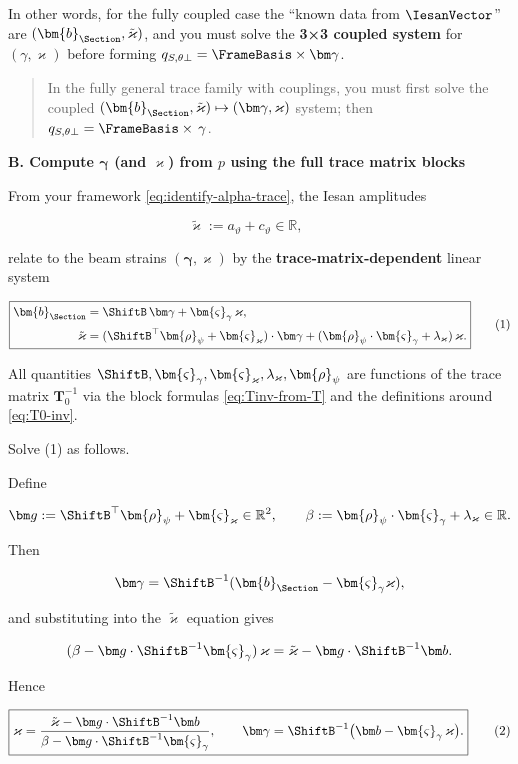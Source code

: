 \begin{Aside}
In other words, for the fully coupled case the ``known data from \(\IesanVector\)''
are \((\bm{b}_{\Section},\tilde\varkappa)\), and you must solve the
\textbf{3×3 coupled system} for \((\gamma,\varkappa)\) before forming
\(q_{S,\theta\perp}=\FrameBasis\times\bm\gamma\).

\begin{quote}
In the fully general trace family with couplings, you must first solve
the coupled
\((\bm{b}_{\Section},\tilde\varkappa)\mapsto(\bm\gamma,\varkappa)\) system;
then \(q_{S,\theta\perp}=\FrameBasis\times\,\gamma\).
\end{quote}


\textbf{B. Compute \(\bm\gamma\) (and \(\varkappa\))
from \(p\) using the \textbf{full} trace matrix
blocks}

From your framework \eqref{eq:identify-alpha-trace}, the Iesan amplitudes

\[
\tilde\varkappa:= a_\vartheta+c_\vartheta \in\mathbb R,
\qquad
\]

relate to the beam strains \((\bm\gamma,\varkappa)\) by the
\textbf{trace‑matrix‑dependent} linear system

\[
\boxed{
\begin{aligned}
\bm{b}_{\Section} &= \ShiftB\,\bm\gamma + \bm{\varsigma}_{\gamma}\,\varkappa,\\[2pt]
\tilde\varkappa&= (\ShiftB^{\top}\bm{\rho}_{\psi}+ \bm{\varsigma}_{\varkappa})\cdot\bm\gamma
+(\bm{\rho}_{\psi}\cdot\bm{\varsigma}_{\gamma}+\lambda_{\varkappa})\,\varkappa.
\end{aligned}
}
\tag{1}
\]

All quantities
\(\ShiftB,\bm{\varsigma}_{\gamma},\bm{\varsigma}_{\varkappa},\lambda_{\varkappa},\bm{\rho}_{\psi}\)
are functions of the trace matrix \(\mathbf{T}_0^{-1}\) via the block
formulas \eqref{eq:Tinv-from-T} and the definitions around \eqref{eq:T0-inv}.

Solve (1) as follows.

Define

\[
\bm g := \ShiftB^{\top}\bm{\rho}_{\psi}+ \bm{\varsigma}_{\varkappa}\in\mathbb R^2,
\qquad
\beta := \bm{\rho}_{\psi}\cdot\bm{\varsigma}_{\gamma}+\lambda_{\varkappa}\in\mathbb R.
\]

Then

\[
\bm\gamma = \ShiftB^{-1}(\bm{b}_{\Section}-\bm{\varsigma}_{\gamma}\varkappa),
\]

and substituting into the \(\tilde\varkappa\) equation gives

\[
(\beta-\bm g\cdot\ShiftB^{-1}\bm{\varsigma}_{\gamma})\,\varkappa
=
\tilde\varkappa-\bm g\cdot\ShiftB^{-1}\bm b.
\]

Hence

\[\boxed{
\varkappa
=
\frac{\tilde\varkappa-\bm g\cdot\ShiftB^{-1}\bm b}{\beta-\bm g\cdot\ShiftB^{-1}\bm{\varsigma}_{\gamma}},
\qquad
\bm\gamma
=
\ShiftB^{-1}\bigl(\bm b-\bm{\varsigma}_{\gamma}\,\varkappa\bigr).
}
\tag{2}
\]
\end{Aside}